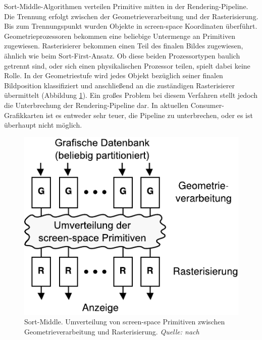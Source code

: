 Sort-Middle-Algorithmen verteilen Primitive mitten in der Rendering-Pipeline. Die Trennung erfolgt zwischen der Geometrieverarbeitung und der Rasterisierung. Bis zum Trennungspunkt wurden Objekte in screen-space Koordinaten überführt. Geometrieprozessoren bekommen eine beliebige Untermenge an Primitiven zugewiesen. Rasterisierer bekommen einen Teil des finalen Bildes zugewiesen, ähnlich wie beim Sort-First-Ansatz. Ob diese beiden Prozessortypen baulich getrennt sind, oder sich einen physikalischen Prozessor teilen, spielt dabei keine Rolle. In der Geometriestufe wird jedes Objekt bezüglich seiner finalen Bildposition klassifiziert und anschließend an die zuständigen Rasterisierer übermittelt (Abbildung \ref{fig:relwork:sortmiddle}). Ein großes Problem bei diesem Verfahren stellt jedoch die Unterbrechung der Rendering-Pipeline dar. In aktuellen Consumer-Grafikkarten ist es entweder sehr teuer, die Pipeline zu unterbrechen, oder es ist überhaupt nicht möglich.
\begin{figure}
 \centering
  \includegraphics[scale=0.8]{images/sort-middle.pdf}
  \caption{Sort-Middle. Umverteilung von screen-space Primitiven zwischen Geometrieverarbeitung und Rasterisierung. \textit{Quelle: nach \cite{molnar}}}
 \label{fig:relwork:sortmiddle}
\end{figure}

